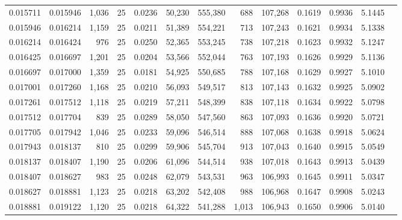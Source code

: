 \begin{tabular}{rrrrrrrrrrrrr}
0.015711 & 0.015946 & 1,036 &  25 &                                     0.0236 &  50,230 & 555,380 &     688 & 107,268 & 0.1619 & 0.9936 & 5.1445 \\
0.015946 & 0.016214 & 1,159 &  25 &                                     0.0211 &  51,389 & 554,221 &     713 & 107,243 & 0.1621 & 0.9934 & 5.1338 \\
0.016214 & 0.016424 &   976 &  25 &                                     0.0250 &  52,365 & 553,245 &     738 & 107,218 & 0.1623 & 0.9932 & 5.1247 \\
0.016425 & 0.016697 & 1,201 &  25 &                                     0.0204 &  53,566 & 552,044 &     763 & 107,193 & 0.1626 & 0.9929 & 5.1136 \\
0.016697 & 0.017000 & 1,359 &  25 &                                     0.0181 &  54,925 & 550,685 &     788 & 107,168 & 0.1629 & 0.9927 & 5.1010 \\
0.017001 & 0.017260 & 1,168 &  25 &                                     0.0210 &  56,093 & 549,517 &     813 & 107,143 & 0.1632 & 0.9925 & 5.0902 \\
0.017261 & 0.017512 & 1,118 &  25 &                                     0.0219 &  57,211 & 548,399 &     838 & 107,118 & 0.1634 & 0.9922 & 5.0798 \\
0.017512 & 0.017704 &   839 &  25 &                                     0.0289 &  58,050 & 547,560 &     863 & 107,093 & 0.1636 & 0.9920 & 5.0721 \\
0.017705 & 0.017942 & 1,046 &  25 &                                     0.0233 &  59,096 & 546,514 &     888 & 107,068 & 0.1638 & 0.9918 & 5.0624 \\
0.017943 & 0.018137 &   810 &  25 &                                     0.0299 &  59,906 & 545,704 &     913 & 107,043 & 0.1640 & 0.9915 & 5.0549 \\
0.018137 & 0.018407 & 1,190 &  25 &                                     0.0206 &  61,096 & 544,514 &     938 & 107,018 & 0.1643 & 0.9913 & 5.0439 \\
0.018407 & 0.018627 &   983 &  25 &                                     0.0248 &  62,079 & 543,531 &     963 & 106,993 & 0.1645 & 0.9911 & 5.0347 \\
0.018627 & 0.018881 & 1,123 &  25 &                                     0.0218 &  63,202 & 542,408 &     988 & 106,968 & 0.1647 & 0.9908 & 5.0243 \\
0.018881 & 0.019122 & 1,120 &  25 &                                     0.0218 &  64,322 & 541,288 &   1,013 & 106,943 & 0.1650 & 0.9906 & 5.0140 \\

\end{tabular}
